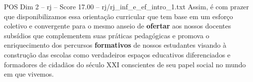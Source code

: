 \begin{textsample}{POS Dim 2 – rj – Score 17.00 – rj/rj\_inf\_e\_ef\_intro\_1.txt}
Assim, é com prazer que disponibilizamos essa orientação curricular que tem base em um esforço coletivo e convergente para o mesmo anseio de \textbf{ofertar} aos nossos docentes subsídios que complementem suas práticas pedagógicas e promova o enriquecimento dos percursos \textbf{formativos} de nossos estudantes visando à construção das escolas como verdadeiros espaços educativos diferenciados e formadores de cidadãos do século XXI conscientes de seu papel social no mundo em que vivemos.

\end{textsample}
